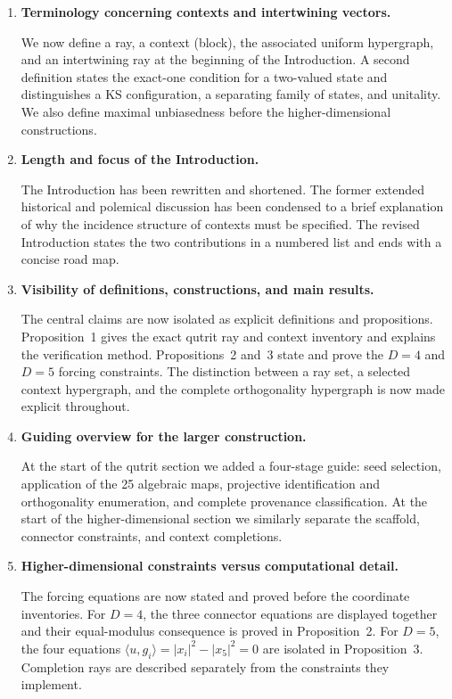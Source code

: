 \documentclass[11pt]{article}
\begin{document}
\begin{enumerate}
\item \textbf{Terminology concerning contexts and intertwining vectors.}

We now define a ray, a context (block), the associated uniform hypergraph, and an intertwining ray at the beginning of the Introduction.  A second definition states the exact-one condition for a two-valued state and distinguishes a KS configuration, a separating family of states, and unitality.  We also define maximal unbiasedness before the higher-dimensional constructions.

\item \textbf{Length and focus of the Introduction.}

The Introduction has been rewritten and shortened.  The former extended historical and polemical discussion has been condensed to a brief explanation of why the incidence structure of contexts must be specified.  The revised Introduction states the two contributions in a numbered list and ends with a concise road map.

\item \textbf{Visibility of definitions, constructions, and main results.}

The central claims are now isolated as explicit definitions and propositions.  Proposition~1 gives the exact qutrit ray and context inventory and explains the verification method.  Propositions~2 and~3 state and prove the $D=4$ and $D=5$ forcing constraints.  The distinction between a ray set, a selected context hypergraph, and the complete orthogonality hypergraph is now made explicit throughout.

\item \textbf{Guiding overview for the larger construction.}

At the start of the qutrit section we added a four-stage guide: seed selection, application of the 25 algebraic maps, projective identification and orthogonality enumeration, and complete provenance classification.  At the start of the higher-dimensional section we similarly separate the scaffold, connector constraints, and context completions.

\item \textbf{Higher-dimensional constraints versus computational detail.}

The forcing equations are now stated and proved before the coordinate inventories.  For $D=4$, the three connector equations are displayed together and their equal-modulus consequence is proved in Proposition~2.  For $D=5$, the four equations $\langle u,g_i\rangle=|x_i|^2-|x_5|^2=0$ are isolated in Proposition~3.  Completion rays are described separately from the constraints they implement.
\end{enumerate}
\end{document}
